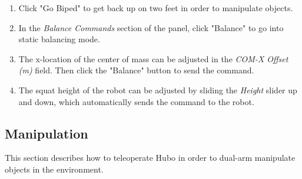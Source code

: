 \documentclass[letterpaper, 10 pt]{report}
\begin{document}
\begin{enumerate}
    \item Click "Go Biped" to get back up on two feet in order to manipulate objects.
    \item In the \textit{Balance Commands} section of the panel, click "Balance" to go into static balancing mode.
    \item The x-location of the center of mass can be adjusted in the \textit{COM-X Offset (m)} field. Then click the "Balance" button to send the command.
    \item The squat height of the robot can be adjusted by sliding the \textit{Height} slider up and down, which automatically sends the command to the robot.
  \end{enumerate}

\subsection*{Manipulation}
This section describes how to teleoperate Hubo in order to dual-arm manipulate objects in the environment.
\end{document}
